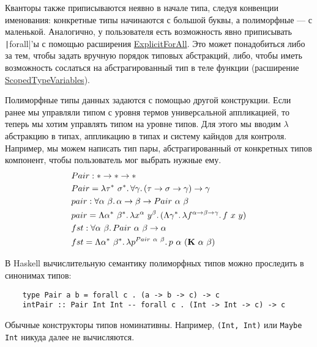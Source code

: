 Кванторы также приписываются неявно в начале типа, следуя конвенции именования: конкретные типы начинаются с большой буквы, а полиморфные --- с маленькой.
Аналогично, у пользователя есть возможность явно приписывать \texttt|forall|'ы с помощью расширения \href{https://downloads.haskell.org/ghc/latest/docs/users_guide/exts/explicit_forall.html\#extension-ExplicitForAll}{ExplicitForAll}.
Это может понадобиться либо за тем, чтобы задать вручную порядок типовых абстракций, либо, чтобы иметь возможность сослаться на абстрагированный тип в теле функции (расширение \href{https://downloads.haskell.org/ghc/latest/docs/users_guide/exts/scoped_type_variables.html#extension-ScopedTypeVariables}{ScopedTypeVariables}).

Полиморфные типы данных задаются с помощью другой конструкции.
Если ранее мы управляли типом с уровня термов универсальной аппликацией, то теперь мы хотим управлять типом на уровне типов.
Для этого мы вводим $\lambda$ абстракцию в типах, аппликацию в типах и систему кайндов для контроля.
Например, мы можем написать тип пары, абстрагированный от конкретных типов компонент, чтобы пользователь мог выбрать нужные ему.
\begin{align*}
    &Pair : * \rightarrow * \rightarrow * \\
    &Pair = \lambda \tau^*~\sigma^*\ldotp\forall \gamma\ldotp(\tau\rightarrow\sigma\rightarrow\gamma)\to\gamma \\
    &pair : \forall \alpha~\beta\ldotp\alpha \rightarrow \beta \rightarrow Pair~\alpha~\beta \\
    &pair = \Lambda \alpha^*~\beta^*\ldotp\lambda x^\alpha~y^\beta\ldotp(\Lambda \gamma^*\ldotp\lambda f^{\alpha\rightarrow\beta\rightarrow\gamma}\ldotp f~x~y) \\
    &fst : \forall \alpha~\beta\ldotp Pair~\alpha~\beta\rightarrow \alpha \\
    &fst = \Lambda \alpha^*~\beta^*\ldotp\lambda p^{Pair~\alpha~\beta}\ldotp p~\alpha~(\mathbf{K}~\alpha~\beta)
\end{align*}

В Haskell вычислительную семантику полиморфных типов можно проследить в синонимах типов:
\begin{verbatim}
    type Pair a b = forall c . (a -> b -> c) -> c
    intPair :: Pair Int Int -- forall c . (Int -> Int -> c) -> c
\end{verbatim}
Обычные конструкторы типов номинативны.
Например, \texttt{(Int, Int)} или \texttt{Maybe Int} никуда далее не вычисляются.

